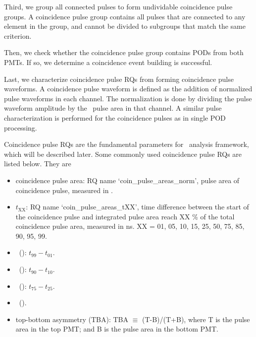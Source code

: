 Third, we group all connected pulses to form undividable coincidence pulse groups. A coincidence pulse group contains all pulses that are connected to any element in the group, and cannot be divided to subgroups that match the same criterion. 

Then, we check whether the coincidence pulse group contains PODs from both PMTs. If so, we determine a coincidence event building is successful.

Last, we characterize coincidence pulse RQs from forming coincidence pulse waveforms. A coincidence pulse waveform is defined as the addition of normalized pulse waveforms in each channel. The normalization is done by dividing the pulse waveform amplitude by the \sphe\ pulse area in that channel. A similar pulse characterization is performed for the coincidence pulses as in single POD processing.    

Coincidence pulse RQs are the fundamental parameters for \ees\ analysis framework, which will be described later. Some commonly used coincidence pulse RQs are listed below. They are
\begin{itemize}
\item coincidence pulse area: RQ name `coin\_pulse\_areas\_norm', pulse area of coincidence pulse, measured in \si{\phe}.
\item $t_{\text{XX}}$: RQ name `coin\_pulse\_areas\_tXX', time difference between the start of the coincidence pulse and integrated pulse area reach XX \% of the total coincidence pulse area, measured in \si{ns}. XX = 01, 05, 10, 15, 25, 50, 75, 85, 90, 95, 99.
\item \pud\  (\tzeronine ): $t_{99}-t_{01}$.
\item \rpd\ (\ttenninety ): $t_{90}-t_{10}$.
\item \stw\ (\ttwoseven ): $t_{75}-t_{25}$.
\item \shw\ (\tfifty ).
\item top-bottom asymmetry (TBA): TBA $\equiv$ (T-B)/(T+B),  where T is the pulse area in the top PMT; and B is the pulse area in the bottom PMT. 
\end{itemize}

